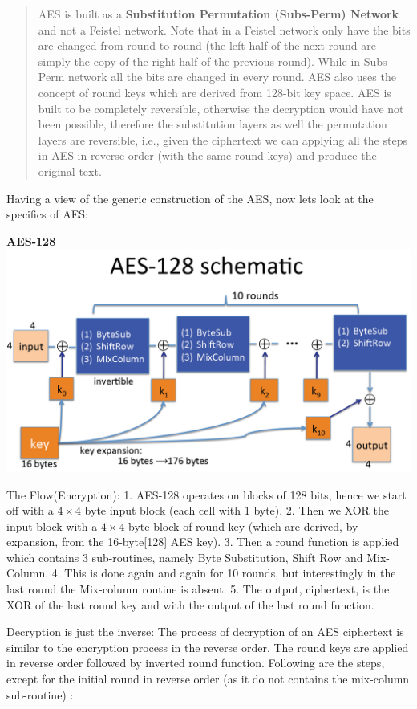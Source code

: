 \documentclass[11pt]{article}
\makeatletter
\def\maxwidth{\ifdim\Gin@nat@width>\linewidth\linewidth
    \else\Gin@nat@width\fi}
\let\Oldincludegraphics\includegraphics
\renewcommand{\includegraphics}[1]{\Oldincludegraphics[width=.8\maxwidth]{#1}}
\makeatother
\begin{document}
\begin{quote}
AES is built as a \textbf{Substitution Permutation (Subs-Perm) Network}
and not a Feistel network. Note that in a Feistel network only have the
bits are changed from round to round (the left half of the next round
are simply the copy of the right half of the previous round). While in
Subs-Perm network all the bits are changed in every round. AES also uses
the concept of round keys which are derived from 128-bit key space. AES
is built to be completely reversible, otherwise the decryption would
have not been possible, therefore the substitution layers as well the
permutation layers are reversible, i.e., given the ciphertext we can
applying all the steps in AES in reverse order (with the same round
keys) and produce the original text.
\end{quote}

Having a view of the generic construction of the AES, now lets look at
the specifics of AES:

\textbf{AES-128} \includegraphics{./Images/AES-128.png}

The Flow(Encryption): 1. AES-128 operates on blocks of 128 bits, hence
we start off with a \(4\times 4\) byte input block (each cell with 1
byte). 2. Then we XOR the input block with a \(4\times 4\) byte block of
round key (which are derived, by expansion, from the 16-byte{[}128{]}
AES key). 3. Then a round function is applied which contains 3
sub-routines, namely Byte Substitution, Shift Row and Mix-Column. 4.
This is done again and again for 10 rounds, but interestingly in the
last round the Mix-column routine is absent. 5. The output, ciphertext,
is the XOR of the last round key and with the output of the last round
function.

Decryption is just the inverse: The process of decryption of an AES
ciphertext is similar to the encryption process in the reverse order.
The round keys are applied in reverse order followed by inverted round
function. Following are the steps, except for the initial round in
reverse order (as it do not contains the mix-column sub-routine) :
\end{document}
